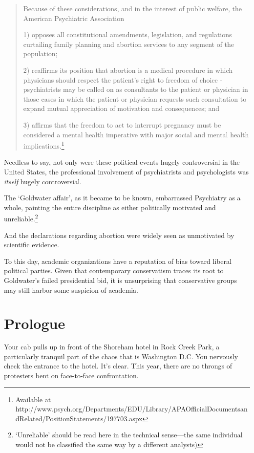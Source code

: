 \begin{refsection}
\begin{quote}
Because of these considerations, and in the interest of public welfare, the American Psychiatric Association

1) opposes all constitutional amendments, legislation, and regulations curtailing family planning and abortion services to any segment of the population; 

2) reaffirms its position that abortion is a medical procedure in which physicians should respect the patient's right to freedom of choice - psychiatrists may be called on as consultants to the patient or physician in those cases in which the patient or physician requests such consultation to expand mutual appreciation of motivation and consequences; and 

3) affirms that the freedom to act to interrupt pregnancy must be considered a mental health imperative with major social and mental health implications.\footnote{Available at http:\slash \slash www.psych.org\slash Departments\slash EDU\slash Library\slash APAOfficialDocumentsandRelated\slash PositionStatements\slash 197703.aspx} ~\citep{Anonymous:1967hr}
\end{quote}

Needless to say, not only were these political events hugely controversial in the United States, the professional involvement of psychiatrists and psychologists was \emph{itself} hugely controversial. 

The `Goldwater affair', as it became to be known, embarrassed Psychiatry as a whole, painting the entire discipline as either politically motivated and unreliable.\footnote{`Unreliable' should be read here in the technical sense---the same individual would not be classified the same way by a different analysts)} 

And the declarations regarding abortion were widely seen as unmotivated by scientific evidence.

To this day, academic organizations have a reputation of bias toward liberal political parties. Given that contemporary conservatism traces its root to Goldwater's failed presidential bid, it is unsurprising that conservative groups may still harbor some suspicion of academia.

\section{Prologue}
\label{prologue}

Your cab pulls up in front of the Shoreham hotel in Rock Creek Park, a particularly tranquil part of the chaos that is Washington D.C. You nervously check the entrance to the hotel. It's clear. This year, there are no throngs of protesters bent on face-to-face confrontation.


\end{refsection}
